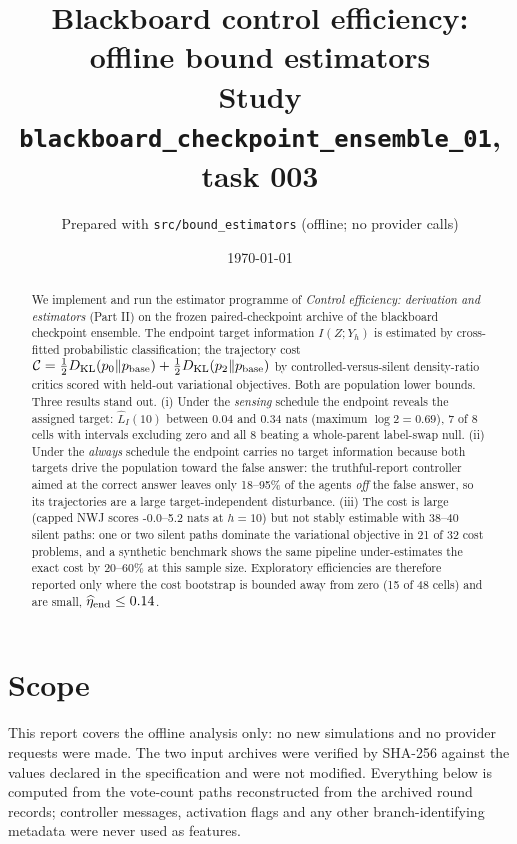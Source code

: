 \documentclass[10pt]{article}
\title{Blackboard control efficiency: offline bound estimators\\ \large Study \texttt{blackboard\_checkpoint\_ensemble\_01}, task 003}
\author{Prepared with \texttt{src/bound\_estimators} (offline; no provider calls)}
\date{\today}
\newcommand{\KL}{D_{\mathrm{KL}}}
\newcommand{\Cost}{\mathcal{C}}
\newcommand{\Lhat}{\widehat L}
\begin{document}
\maketitle

\begin{abstract}
We implement and run the estimator programme of \emph{Control efficiency: derivation and estimators} (Part II) on the frozen paired-checkpoint archive of the blackboard checkpoint ensemble. The endpoint target information $I(Z;Y_h)$ is estimated by cross-fitted probabilistic classification; the trajectory cost $\Cost=\tfrac12\KL(p_0\Vert p_{\rm base})+\tfrac12\KL(p_2\Vert p_{\rm base})$ by controlled-versus-silent density-ratio critics scored with held-out variational objectives. Both are population lower bounds. Three results stand out. (i) Under the \emph{sensing} schedule the endpoint reveals the assigned target: $\Lhat_I(10)$ between 0.04 and 0.34 nats (maximum $\log 2=0.69$), 7 of 8 cells with intervals excluding zero and all 8 beating a whole-parent label-swap null. (ii) Under the \emph{always} schedule the endpoint carries no target information because both targets drive the population toward the false answer: the truthful-report controller aimed at the correct answer leaves only 18--95\% of the agents \emph{off} the false answer, so its trajectories are a large target-independent disturbance. (iii) The cost is large (capped NWJ scores -0.0--5.2 nats at $h=10$) but not stably estimable with 38--40 silent paths: one or two silent paths dominate the variational objective in 21 of 32 cost problems, and a synthetic benchmark shows the same pipeline under-estimates the exact cost by 20--60\% at this sample size. Exploratory efficiencies are therefore reported only where the cost bootstrap is bounded away from zero (15 of 48 cells) and are small, $\widehat\eta_{\rm end}\le 0.14$.
\end{abstract}

\tableofcontents

\section{Scope}
This report covers the offline analysis only: no new simulations and no provider requests were made. The two input archives were verified by SHA-256 against the values declared in the specification and were not modified. Everything below is computed from the vote-count paths reconstructed from the archived round records; controller messages, activation flags and any other branch-identifying metadata were never used as features.
\end{document}
